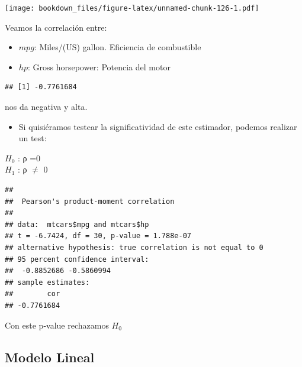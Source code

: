 \documentclass[]{book}
\newenvironment{Shaded}{\begin{snugshade}}{\end{snugshade}}
\newcommand{\KeywordTok}[1]{\textcolor[rgb]{0.13,0.29,0.53}{\textbf{#1}}}
\newcommand{\NormalTok}[1]{#1}
\newcommand{\OperatorTok}[1]{\textcolor[rgb]{0.81,0.36,0.00}{\textbf{#1}}}
\providecommand{\tightlist}{%
  \setlength{\itemsep}{0pt}\setlength{\parskip}{0pt}}
\begin{document}
\texttt{[image: bookdown\_files/figure-latex/unnamed-chunk-126-1.pdf]}

Veamos la correlación entre:

\begin{itemize}
\tightlist
\item
  \(mpg\): Miles/(US) gallon. Eficiencia de combustible
\item
  \(hp\): Gross horsepower: Potencia del motor
\end{itemize}

\begin{Shaded}
\end{Shaded}

\begin{verbatim}
## [1] -0.7761684
\end{verbatim}

nos da negativa y alta.

\begin{itemize}
\tightlist
\item
  Si quisiéramos testear la significatividad de este estimador, podemos realizar un test:
\end{itemize}

\(H_0\) : ρ =0\\
\(H_1\) : ρ \(\neq\) 0

\begin{Shaded}
\end{Shaded}

\begin{verbatim}
## 
##  Pearson's product-moment correlation
## 
## data:  mtcars$mpg and mtcars$hp
## t = -6.7424, df = 30, p-value = 1.788e-07
## alternative hypothesis: true correlation is not equal to 0
## 95 percent confidence interval:
##  -0.8852686 -0.5860994
## sample estimates:
##        cor 
## -0.7761684
\end{verbatim}

Con este p-value rechazamos \(H_0\)

\hypertarget{modelo-lineal-1}{%
\subsection{Modelo Lineal}\label{modelo-lineal-1}}
\end{document}
